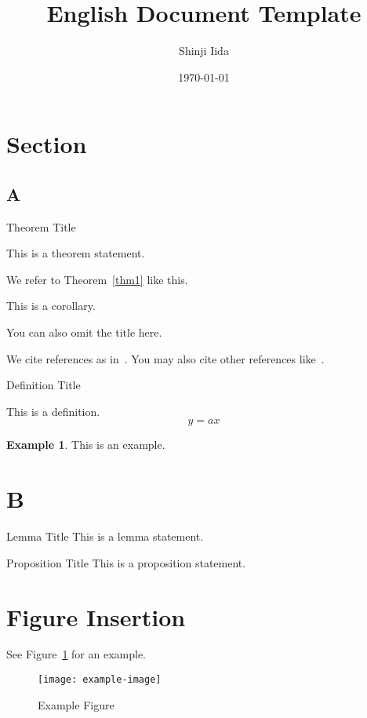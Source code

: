 \documentclass[12pt,dvipdfmx]{article}
\title{English Document Template}
\author{Shinji Iida}
\date{\today}
\theoremstyle{definition} %
\newtheorem{ex}{Example}[section]
\newenvironment{thm}[2][]{%
  \begin{thmBox}[#1]{#2}{}%
}{%
  \end{thmBox}
}
\newenvironment{dfn}[2][]{
  \begin{dfnBox}[#1]{#2}{}
}{
  \end{dfnBox}
}
\newenvironment{prop}[2][]{
  \begin{propBox}[#1]{#2}{}
}{
  \end{propBox}
}
\newenvironment{lem}[2][]{
  \begin{lemBox}[#1]{#2}{}
}{
  \end{lemBox}
}
\newenvironment{cor}[2][]{
  \begin{corBox}[#1]{#2}{}
}{
  \end{corBox}
}
\begin{document}
\maketitle

\tableofcontents

\section{Section}
\subsection{A}

\begin{thm}[label={thm1}]{Theorem Title}
This is a theorem statement.
\end{thm}
We refer to Theorem~\ref{thm1} like this.

\begin{cor}{}
This is a corollary.
\end{cor}

\begin{thm}[label={thm2}]{}
You can also omit the title here.
\end{thm}

We cite references as in~\cite{Iida2023-sl,Iida2022-qt,Iida2019-xh}.  
You may also cite other references like~\cite{2023-xn}.

\begin{dfn}{Definition Title}
This is a definition.
\begin{equation}
  y = ax
\end{equation}
\end{dfn}

\begin{ex}
This is an example.
\end{ex}

\section{B}

\begin{lem}{Lemma Title}{}
This is a lemma statement.
\end{lem}

\begin{prop}{Proposition Title}{}
This is a proposition statement.
\end{prop}

\section{Figure Insertion}
See Figure~\ref{fig:example} for an example.
\begin{figure}[h]
    \centering
    \texttt{[image: example-image]}
    \caption{Example Figure}
    \label{fig:example}
\end{figure}


%



\end{document}
